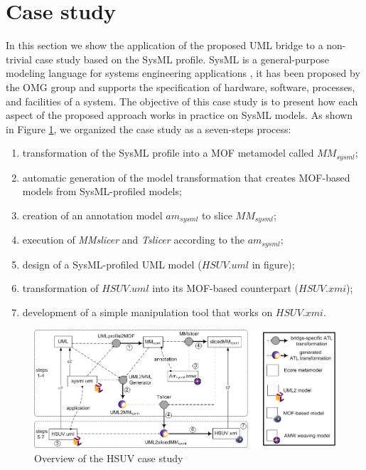 \section{Case study}\label{sec:caseStudy}
In this section we show the application of the proposed UML bridge to a non-trivial case study based on the SysML profile.
SysML is a general-purpose modeling language for systems engineering applications \cite{sysml}, it has been proposed by the OMG group
and supports the specification of  hardware, software, processes, and facilities of a system.
The objective of this case study is to present how each aspect of the proposed approach works in practice on SysML models.
As shown in Figure \ref{fig:caseStudy}, we organized the case study as a seven-steps process:
%
\begin{enumerate}
	\item transformation of the SysML profile into a MOF metamodel called $MM_{sysml}$;
	\item automatic generation of the model transformation that creates MOF-based models from SysML-profiled models;
	\item creation of an annotation model $am_{sysml}$ to slice $MM_{sysml}$;
	\item execution of \textit{MMslicer} and \textit{Tslicer} according to the $am_{sysml}$;
	\item design of a SysML-profiled UML model ($HSUV.uml$ in figure);
	\item transformation of $HSUV.uml$ into its MOF-based counterpart ($HSUV.xmi$);
	\item development of a simple manipulation tool that works on $HSUV.xmi$.
\end{enumerate}
%
\vspace{-.4cm}
\begin{figure}[htbp]
	\centering
		\includegraphics[width=1\textwidth]{figures/caseStudy.png}
	\caption{Overview of the HSUV case study}
	\label{fig:caseStudy}
\end{figure}
\vspace{-.4cm}

